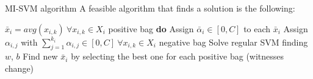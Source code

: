 \begin{frame}{MI-SVM algorithm}
	A feasible algorithm that finds a solution is the following:
	
	\begin{codebox}
		\li $\bar{x}_i = avg(x_{i,k}) \ \forall x_{i,k} \in X_i$ positive bag
		\li \textbf{do} \Do
		\li Assign $\bar{\alpha}_i \in [0,C]$ to each $\bar{x}_i$
		\li Assign $\alpha_{i,j}$ with $\sum_{j=1}^{k_i}\alpha_{i,j} \in [0,C] \ \forall x_{i,k} \in X_i$ negative bag
		\li Solve regular SVM finding $w$, $b$
		\li Find new $\bar{x}_i$ by selecting the best one for each positive bag \End
		\li \While(witnesses change)
		
	\end{codebox}
	
\end{frame}

